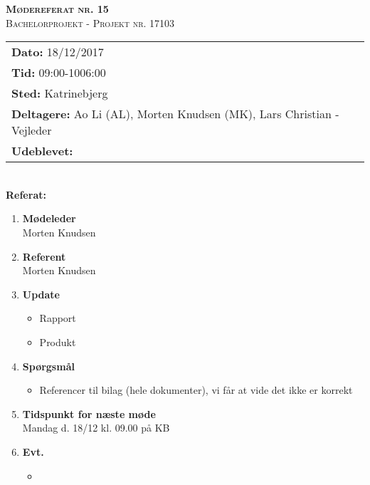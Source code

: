 
\newcommand{\HRule}{\rule{\linewidth}{0.1mm}}


	\begin{center}
		{\huge \bfseries \textsc{Mødereferat nr. 15}}\\
		\textsc{\large Bachelorprojekt - Projekt nr. 17103}\\[0.3cm]
	\end{center}
	\begin{tabular}{ll}
	\large \textbf{Dato:} 18/12/2017  	\\ %
	\large \textbf{Tid:}  09:00-1006:00 	\\ %
	\large \textbf{Sted:} Katrinebjerg		\\ %
	\large \textbf{Deltagere:} Ao Li (AL), Morten Knudsen (MK), Lars Christian - Vejleder \\
	\large \textbf{Udeblevet:} 
	\end{tabular}\\
	\phantom{\,}\hspace{0.1em} \large \textbf{Referat:}
	\begin{enumerate}
		\itemsep 0.3em 
		\item \textbf{Mødeleder}\\
			Morten Knudsen
		\item \textbf{Referent}\\
			Morten Knudsen

		\item \textbf{Update}
			\begin{itemize}[-]
				\item Rapport 
				\item Produkt			
			\end{itemize}
		
							
		\item \textbf{Spørgsmål}
			\begin{itemize}[-]
				\item Referencer til bilag (hele dokumenter), vi får at vide det ikke er korrekt
					
			\end{itemize}
	
		\item \textbf{Tidspunkt for næste møde} \\
			Mandag d. 18/12 kl. 09.00 på KB \\
						
		\item \textbf{Evt.}
			\begin{itemize}[-]
				\item 
			\end{itemize}
			
	\end{enumerate}
